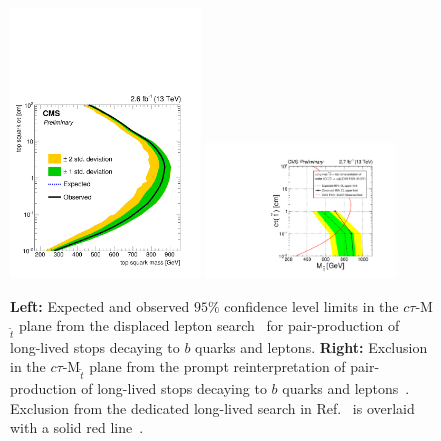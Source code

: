 \begin{figure}[h]
\begin{center}
\includegraphics[width=0.45\textwidth,angle=0]{ch5-figures/CMS-PAS-EXO-16-022_Figure_004.pdf}
\includegraphics[width=0.45\textwidth,angle=0]{ch5-figures/CMS-PAS-EXO-16-007_Figure-aux_001.pdf}
\end{center}
\caption{{\bf Left:} Expected and observed $95\%$ confidence level limits in the $c\tau$-M$_{\tilde{t}}$ plane from the displaced lepton search~\cite{CMS-PAS-EXO-16-022} for pair-production of long-lived stops decaying to $b$ quarks and leptons. {\bf Right:} Exclusion in the $c\tau$-M$_{\tilde{t}}$ plane from the prompt reinterpretation of pair-production of long-lived stops decaying to $b$ quarks and leptons~\cite{CMS-PAS-EXO-16-007}. Exclusion from the dedicated long-lived search in Ref.~\cite{CMS-PAS-EXO-16-022} is overlaid with a solid red line~\cite{CMS-EXO-16-007url}.}
\label{fig:exo-16}
\end{figure}




